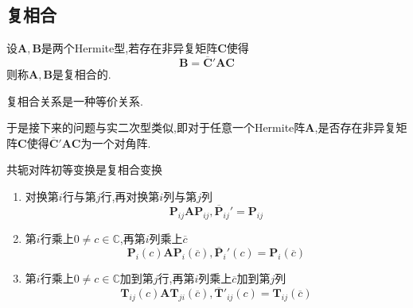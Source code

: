 \subsection{复相合}
\begin{formal}
    \begin{definition}[复相合的定义]\label{def:复相合的定义}
        设$\bm{A},\bm{B}$是两个\textup{Hermite}型,若存在非异复矩阵$\bm{C}$使得\[
        \bm{B}=\overline{\bm{C}}'\bm{AC}
        \]则称$\bm{A},\bm{B}$是复相合的.
    \end{definition}
\end{formal}
\begin{formal}
    \begin{theorem}[复相合关系]\label{thm:复相合关系}
        复相合关系是一种等价关系.
    \end{theorem}
\end{formal}
\begin{red}
    \begin{remark}
        于是接下来的问题与实二次型类似,即对于任意一个\textup{Hermite}阵$\bm{A}$,是否存在非异复矩阵$\bm{C}$使得$\overline{\bm{C}}'\bm{AC}$为一个对角阵.
    \end{remark}
\end{red}
\begin{formal}
    \begin{definition}[共轭对称初等变换的定义]\label{def:共轭对称初等变换的定义}
        共轭对阵初等变换是复相合变换\begin{enumerate}[label={\textup{(\arabic*)}}]
            \item 对换第$i$行与第$j$行,再对换第$i$列与第$j$列\[
            \bm{P}_{ij}\bm{AP}_{ij},\overline{\bm{P}}_{ij}'=\bm{P}_{ij}        
             \]
             \item 第$i$行乘上$0\neq c\in\mathbb{C}$,再第$i$列乘上$\overline{c}$\[
             \bm{P}_i\left(c\right)\bm{AP}_i\left(\overline{c}\right),\overline{\bm{P}}_i'\left(c\right)=\bm{P}_i\left(\overline{c}\right)
                \]
                \item 第$i$行乘上$0\neq c\in\mathbb{C}$加到第$j$行,再第$i$列乘上$\overline{c}$加到第$j$列\[
                \bm{T}_{ij}\left(c\right)\bm{AT}_{ji}\left(\overline{c}\right),\overline{\bm{T}}'_{ij}\left(c\right)=\bm{T}_{ij}\left(\overline{c}\right)
                \]
        \end{enumerate}
    \end{definition}
\end{formal}
